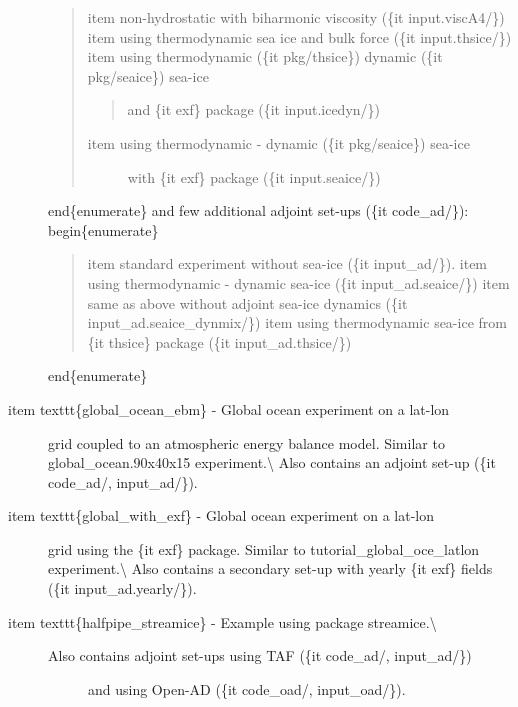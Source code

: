 \documentclass[letterpaper,10pt,english]{sphinxmanual}
\begin{document}
\begin{description}
\begin{quote}
item non-hydrostatic with biharmonic viscosity (\{it input.viscA4/\})
item using thermodynamic sea ice and bulk force (\{it input.thsice/\})
item using thermodynamic (\{it pkg/thsice\}) dynamic (\{it pkg/seaice\}) sea-ice
\begin{quote}

and \{it exf\} package (\{it input.icedyn/\})
\end{quote}
\begin{description}
\item[{item using thermodynamic - dynamic (\{it pkg/seaice\}) sea-ice}] \leavevmode
with \{it exf\} package (\{it input.seaice/\})

\end{description}
\end{quote}

end\{enumerate\}
and few additional adjoint set-ups (\{it code\_ad/\}):
begin\{enumerate\}
\begin{quote}

item standard experiment without sea-ice (\{it input\_ad/\}).
item using thermodynamic - dynamic sea-ice (\{it input\_ad.seaice/\})
item same as above without adjoint sea-ice dynamics (\{it input\_ad.seaice\_dynmix/\})
item using thermodynamic sea-ice from \{it thsice\} package (\{it input\_ad.thsice/\})
\end{quote}

end\{enumerate\}

\item[{item texttt\{global\_ocean\_ebm\} - Global ocean experiment on a lat-lon}] \leavevmode
grid coupled to an atmospheric energy balance model. Similar to
global\_ocean.90x40x15 experiment.\textbackslash{}
Also contains an adjoint set-up (\{it code\_ad/, input\_ad/\}).

\item[{item texttt\{global\_with\_exf\} - Global ocean experiment on a lat-lon}] \leavevmode
grid using the \{it exf\} package. Similar to tutorial\_global\_oce\_latlon
experiment.\textbackslash{}
Also contains a secondary set-up with yearly \{it exf\} fields (\{it input\_ad.yearly/\}).

\item[{item texttt\{halfpipe\_streamice\} - Example using package \sphinxquotedblleft{}streamice\sphinxquotedblright{}.\textbackslash{}}] \leavevmode\begin{description}
\item[{Also contains adjoint set-ups using TAF (\{it code\_ad/, input\_ad/\})}] \leavevmode
and using Open-AD (\{it code\_oad/, input\_oad/\}).


\end{description}
\end{description}
\end{document}

